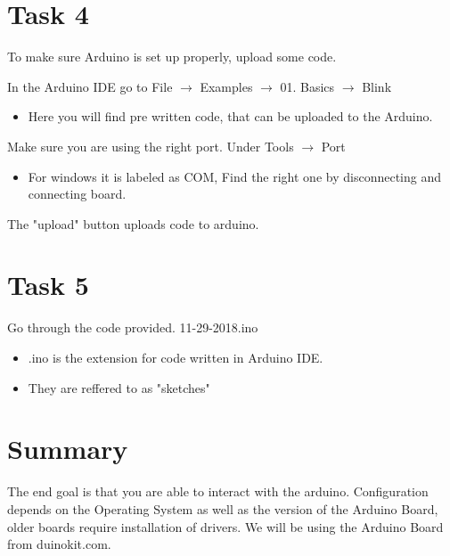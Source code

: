 \documentclass[12pt]{article}
\begin{document}
\section*{Task 4}
To make sure Arduino is set up properly, upload some code. 
\begin{todolist}
    \item In the Arduino IDE go to File $\rightarrow$ Examples $\rightarrow$ 01. Basics $\rightarrow$ Blink
    \begin{itemize}
        \item Here you will find pre written code, that can be uploaded to the Arduino. 
    \end{itemize}
    \item Make sure you are using the right port. Under Tools $\rightarrow$ Port
    \begin{itemize}
        \item For windows it is labeled as COM, Find the right one by disconnecting and connecting board. 
    \end{itemize}
    \item The "upload" button uploads code to arduino. 
\end{todolist}
\section*{Task 5}
\begin{todolist}
    \item Go through the code provided. 11-29-2018.ino 
    \begin{itemize}
        \item .ino is the extension for code written in Arduino IDE. 
        \item They are reffered to as "sketches" 
    \end{itemize}
\end{todolist}
\section*{Summary}
The end goal is that you are able to interact with the arduino. Configuration depends on the Operating System as well as the version of the Arduino Board, older boards require installation of drivers. We will be using the Arduino Board from duinokit.com. 
\end{document}
